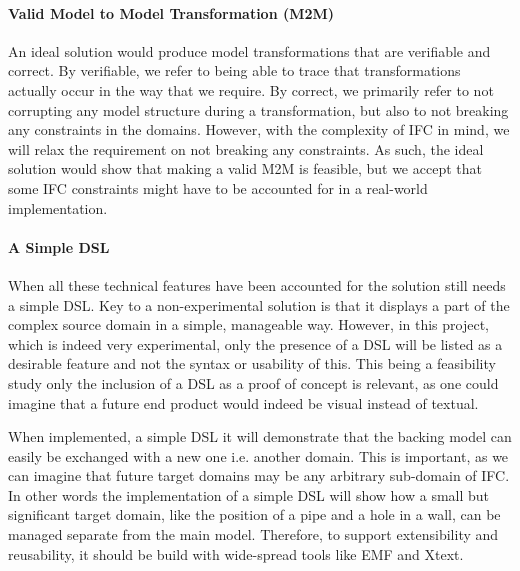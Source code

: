 
\paragraph{Valid Model to Model Transformation (M2M)}
An ideal solution would produce model transformations that are verifiable and correct. By verifiable, we refer to being able to trace that transformations actually occur in the way that we require. By correct, we primarily refer to not corrupting any model structure during a transformation, but also to not breaking any constraints in the domains. However, with the complexity of IFC in mind, we will relax the requirement on not breaking any constraints. As such, the ideal solution would show that making a valid M2M is feasible, but we accept that some IFC constraints might have to be accounted for in a real-world implementation.

\paragraph{A Simple DSL}
When all these technical features have been accounted for the solution still needs a simple DSL. Key to a non-experimental solution is that it displays a part of the complex source domain in a simple, manageable way. However, in this project, which is indeed very experimental, only the presence of a DSL will be listed as a desirable feature and not the syntax or usability of this. This being a feasibility study only the inclusion of a DSL as a proof of concept is relevant, as one could imagine that a future end product would indeed be visual instead of textual.

When implemented, a simple DSL it will demonstrate that the backing model can easily be exchanged with a new one i.e. another domain. This is important, as we can imagine that future target domains may be any arbitrary sub-domain of IFC. In other words the implementation of a simple DSL will show how a small but significant target domain, like the position of a pipe and a hole in a wall, can be managed separate from the main model. Therefore, to support extensibility and reusability, it should be build with wide-spread tools like EMF and Xtext.

